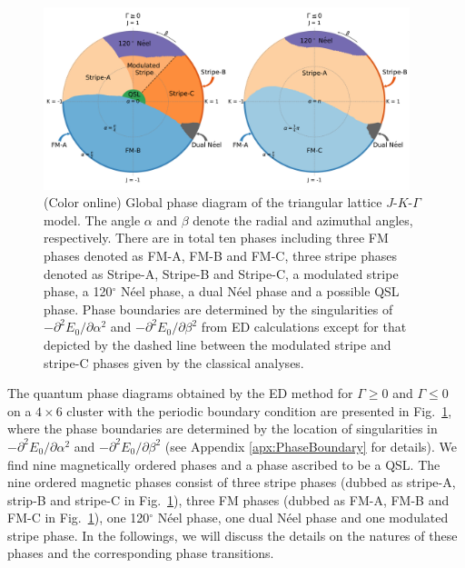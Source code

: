 \documentclass[aps,prb,reprint,amsfonts,amsmath,amssymb,showpacs,groupedaddress,superscriptaddress]{revtex4-1}
\begin{document}
\begin{figure}
    \centering
    \includegraphics[width=0.95\textwidth]{QuantumGlobalPhaseDiagram.pdf}
    \caption{\label{fig:QuantumPhaseDiagram}(Color online) Global phase diagram of the triangular lattice $J$-$K$-$\Gamma$ model. The angle $\alpha$ and $\beta$ denote the radial and azimuthal angles, respectively. There are in total ten phases including three FM phases denoted as FM-A, FM-B and FM-C, three stripe phases denoted as Stripe-A, Stripe-B and Stripe-C, a modulated stripe phase, a 120$^\circ$ N\'{e}el phase, a dual N\'{e}el phase and a possible QSL phase. Phase boundaries are determined by the singularities of $-\partial^2E_0/\partial\alpha^2$ and $-\partial^2E_0/\partial\beta^2$ from ED calculations except for that depicted by the dashed line between the modulated stripe and stripe-C phases given by the classical analyses.}
\end{figure}

The quantum phase diagrams obtained by the ED method for $\Gamma \geq 0$ and $\Gamma \leq 0$ on a $4 \times 6$ cluster with the periodic boundary condition are presented in Fig.~\ref{fig:QuantumPhaseDiagram}, where the phase boundaries are determined by the location of singularities in $-\partial^2E_0/\partial\alpha^2$ and $-\partial^2E_0/\partial\beta^2$ (see Appendix \ref{apx:PhaseBoundary} for details). We find nine magnetically ordered phases and a phase ascribed to be a QSL. The nine ordered magnetic phases consist of three stripe phases (dubbed as stripe-A, strip-B and stripe-C in Fig.~\ref{fig:QuantumPhaseDiagram}), three FM phases (dubbed as FM-A, FM-B and FM-C in Fig.~\ref{fig:QuantumPhaseDiagram}), one 120$^\circ$ N\'{e}el phase, one dual N\'{e}el phase and one modulated stripe phase. In the followings, we will discuss the details on the natures of these phases and the corresponding phase transitions.
\end{document}
